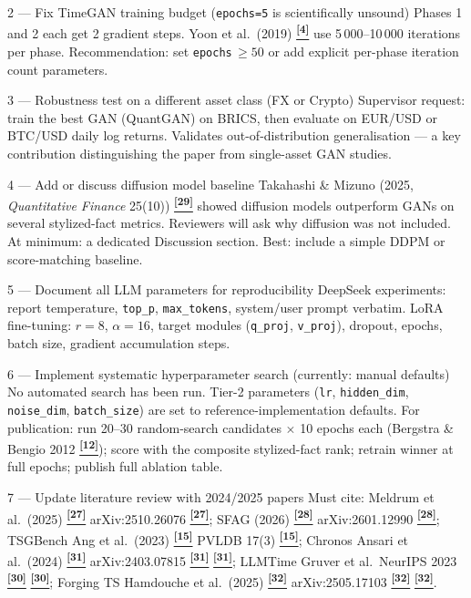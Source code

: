 \documentclass[10pt]{article}
\newcommand{\tcite}[1]{%
  \hyperlink{R:#1}{\textsuperscript{\scriptsize\textbf{[#1]}}}}
\begin{document}
%
  {2 --- Fix TimeGAN training budget (\texttt{epochs=5} is scientifically unsound)}%
  {Phases 1 and 2 each get 2 gradient steps. Yoon et al.\ (2019)\tcite{4} use 5\,000--10\,000 iterations per phase. Recommendation: set \texttt{epochs}\,$\geq 50$ or add explicit per-phase iteration count parameters.}

%
  {3 --- Robustness test on a different asset class (FX or Crypto)}%
  {Supervisor request: train the best GAN (QuantGAN) on BRICS, then evaluate on EUR/USD or BTC/USD daily log returns. Validates out-of-distribution generalisation --- a key contribution distinguishing the paper from single-asset GAN studies.}

%
  {4 --- Add or discuss diffusion model baseline}%
  {Takahashi \& Mizuno (2025, \textit{Quantitative Finance} 25(10))\tcite{29} showed diffusion models outperform GANs on several stylized-fact metrics. Reviewers will ask why diffusion was not included. At minimum: a dedicated Discussion section. Best: include a simple DDPM or score-matching baseline.}

%
  {5 --- Document all LLM parameters for reproducibility}%
  {DeepSeek experiments: report temperature, \texttt{top\_p}, \texttt{max\_tokens}, system/user prompt verbatim. LoRA fine-tuning: $r=8$, $\alpha=16$, target modules (\texttt{q\_proj}, \texttt{v\_proj}), dropout, epochs, batch size, gradient accumulation steps.}

%
  {6 --- Implement systematic hyperparameter search (currently: manual defaults)}%
  {No automated search has been run. Tier-2 parameters (\texttt{lr}, \texttt{hidden\_dim}, \texttt{noise\_dim}, \texttt{batch\_size}) are set to reference-implementation defaults. For publication: run 20--30 random-search candidates $\times$ 10 epochs each (Bergstra \& Bengio 2012\tcite{12}); score with the composite stylized-fact rank; retrain winner at full epochs; publish full ablation table.}

%
  {7 --- Update literature review with 2024/2025 papers}%
  {Must cite: Meldrum et al.\ (2025)\tcite{27} arXiv:2510.26076\tcite{27}; SFAG (2026)\tcite{28} arXiv:2601.12990\tcite{28}; TSGBench Ang et al.\ (2023)\tcite{15} PVLDB 17(3)\tcite{15}; Chronos Ansari et al.\ (2024)\tcite{31} arXiv:2403.07815\tcite{31}\tcite{31}; LLMTime Gruver et al.\ NeurIPS 2023\tcite{30}\tcite{30}; Forging TS Hamdouche et al.\ (2025)\tcite{32} arXiv:2505.17103\tcite{32}\tcite{32}.}
\end{document}
